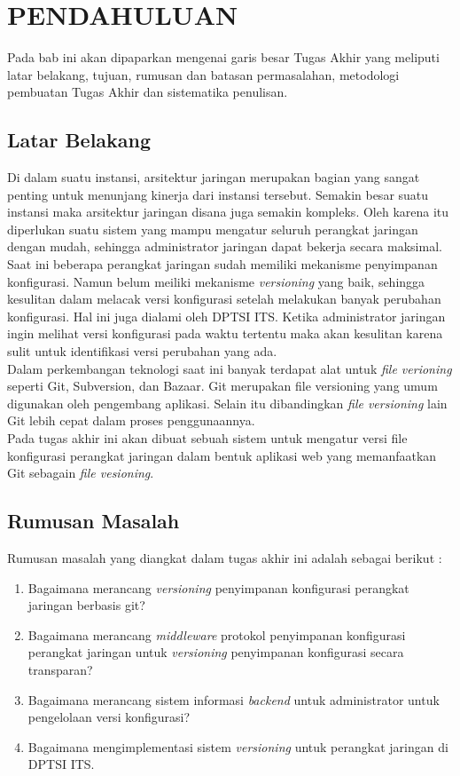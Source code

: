 \chapter{PENDAHULUAN}
	Pada bab ini akan dipaparkan mengenai garis besar Tugas Akhir yang meliputi latar belakang, tujuan, rumusan dan batasan permasalahan, metodologi pembuatan Tugas Akhir dan sistematika penulisan.
        
	\section{Latar Belakang}
		Di dalam suatu instansi, arsitektur jaringan merupakan bagian yang sangat penting untuk menunjang kinerja dari instansi tersebut. Semakin besar suatu instansi maka arsitektur jaringan disana juga semakin kompleks. Oleh karena itu diperlukan suatu sistem yang mampu mengatur seluruh perangkat jaringan dengan mudah, sehingga administrator jaringan dapat bekerja secara maksimal.\\
        \indent Saat ini beberapa perangkat jaringan sudah memiliki mekanisme penyimpanan konfigurasi. Namun belum meiliki mekanisme \textit{versioning} yang baik, sehingga kesulitan dalam melacak versi konfigurasi setelah melakukan banyak perubahan konfigurasi. Hal ini juga dialami oleh DPTSI ITS. Ketika administrator jaringan ingin melihat versi konfigurasi pada waktu tertentu maka akan kesulitan karena sulit untuk identifikasi versi perubahan yang ada.\\
        \indent Dalam perkembangan teknologi saat ini banyak terdapat alat untuk \textit{file verioning} seperti Git, Subversion, dan Bazaar. Git merupakan file versioning yang umum digunakan oleh pengembang aplikasi\cite{versioning_popularity}. Selain itu dibandingkan \textit{file versioning} lain Git lebih cepat dalam proses penggunaannya\cite{git_fast}.\\
	    \indent Pada tugas akhir ini akan dibuat sebuah sistem untuk mengatur versi file konfigurasi perangkat jaringan dalam bentuk aplikasi web  yang memanfaatkan Git sebagain \textit{file vesioning}. 


	\section{Rumusan Masalah}
       	Rumusan masalah yang diangkat dalam tugas akhir ini adalah sebagai berikut :
		\begin{enumerate}
			\item Bagaimana merancang \textit{versioning} penyimpanan konfigurasi perangkat jaringan berbasis git?
			\item Bagaimana merancang \textit{middleware} protokol penyimpanan konfigurasi perangkat jaringan untuk \textit{versioning} penyimpanan konfigurasi secara transparan?
            \item Bagaimana merancang sistem informasi \textit{backend} untuk administrator untuk pengelolaan versi konfigurasi?
            \item Bagaimana mengimplementasi sistem \textit{versioning} untuk perangkat jaringan di DPTSI ITS.
		\end{enumerate}

